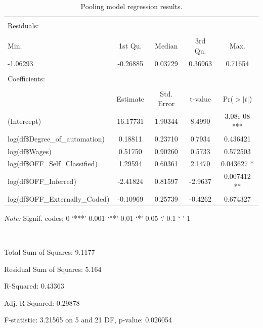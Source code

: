\documentclass[12pt]{article}
\begin{document}
\begin{table}[!htbp] \centering 
\begin{threeparttable}
  \caption{Pooling model regression results.} 
  \label{} 
\begin{tabular}{@{\extracolsep{5pt}}lcccc} 
 \toprule
\midrule
\\
Residuals: \\ 
\hline \\[-1.8ex]
    Min. & 1st Qu. &  Median & 3rd Qu.  &   Max. \\
-1.06293 & -0.26885 & 0.03729 & 0.36963 &  0.71654 \\ 
\\
Coefficients: \\
\hline \\[-1.8ex] 
                  &           Estimate & Std. Error & t-value & Pr($>|t|$)    \\
(Intercept)       &           16.17731 &  1.90344 & 8.4990 & 3.08e-08 *** \\
log(df\$Degree\_of\_automation) & 0.18811 &   0.23710 & 0.7934 & 0.436421    \\
log(df\$Wages)      &       0.51750  &  0.90260 & 0.5733 & 0.572503    \\
log(df\$OFF\_Self\_Classified)  & 1.29594  &  0.60361 & 2.1470 & 0.043627 *  \\
log(df\$OFF\_Inferred)     &    -2.41824 &   0.81597 & -2.9637 & 0.007412 ** \\
log(df\$OFF\_Externally\_Coded) & -0.10969  &  0.25739  & -0.4262 & 0.674327  \\  
\bottomrule
 \end{tabular}
 \begin{tablenotes}
\item \textit{Note:} Signif. codes:  0 ‘***’ 0.001 ‘**’ 0.01 ‘*’ 0.05 ‘.’ 0.1 ‘ ’ 1
\item \
\item Total Sum of Squares:    9.1177
\item Residual Sum of Squares: 5.164
\item R-Squared:      0.43363
\item Adj. R-Squared: 0.29878
\item F-statistic: 3.21565 on 5 and 21 DF, p-value: 0.026054
\end{tablenotes}
  \end{threeparttable}
\end{table} 
\end{document}

